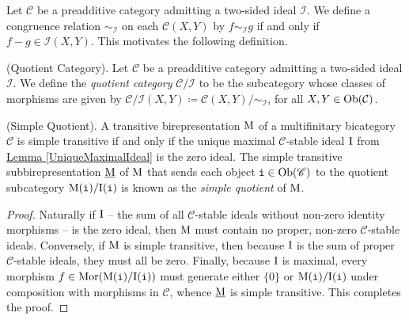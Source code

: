 \noindent Let $\mathcal{C}$ be a preadditive category admitting a two-sided ideal $\mathcal{I}$. We define a congruence relation $\sim_\mathcal{I}$ on each $\mathcal{C}(X, Y)$ by $f \sim_\mathcal{I} g$ if and only if $f - g \in \mathcal{I}(X, Y)$. This motivates the following definition.\newpage

\noindent\begin{definition}\!\textup{(Quotient Category).}\label{QuotientCategory } Let $\mathcal{C}$ be a preadditive category admitting a two-sided ideal $\mathcal{I}$. We define the {\em quotient category} $\mathcal{C}/\mathcal{I}$ to be the subcategory whose classes of morphisms are given by $\mathcal{C}/\mathcal{I}(X, Y) \coloneqq \mathcal{C}(X, Y)/\!\sim_\mathcal{I}$, for all $X, Y \in \textup{Ob}(\mathcal{C})$.\\%
\end{definition}

\noindent\begin{theoremdefinition}\!\textup{(Simple Quotient).}\label{SimpleQuotient} \!A transitive birepresentation $\textup{M}$ of a %
multifinitary bicategory $\mathscr{C}$ is simple transitive if and only if the unique maximal $\mathscr{C}$-stable ideal $\textup{I}$ from \hyperref[UniqueMaximalIdeal]{Lemma \ref*{UniqueMaximalIdeal}} is the zero ideal. The simple transitive subbirepresentation $\underline{\textup{M}}$ of $\textup{M}$ that sends each object $\textup{\texttt{i}} \in \textup{Ob}(\mathscr{C})$ to the quotient subcategory $\textup{M}(\textup{\texttt{i}})/\textup{I}(\textup{\texttt{i}})$ is known as the {\em simple quotient} of $\textup{M}$.\\
\end{theoremdefinition}

\noindent\begin{proof} Naturally if $\textup{I}$ -- the sum of all $\mathscr{C}$-stable ideals without non-zero identity morphisms -- is the zero ideal, then $\textup{M}$ must contain no proper, non-zero $\mathscr{C}$-stable ideals. Conversely, if $\textup{M}$ is simple transitive, then because $\textup{I}$ is the sum of proper $\mathscr{C}$-stable ideals, they must all be zero. Finally, because $\textup{I}$ is maximal, every morphism $f \in \textup{Mor}(\textup{M}(\textup{\texttt{i}})/\textup{I}(\textup{\texttt{i}}))$ must generate either $\{0\}$ or $\textup{M}(\textup{\texttt{i}})/\textup{I}(\textup{\texttt{i}})$ under composition with morphisms in $\mathscr{C}$, whence $\underline{\textup{M}}$ is simple transitive. This completes the proof.
\end{proof}\\

